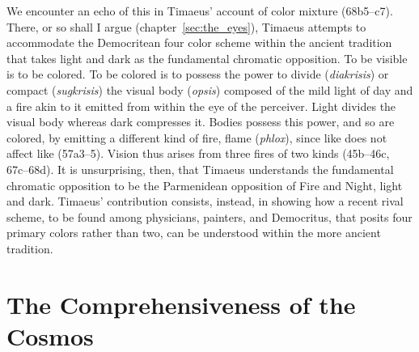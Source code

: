 We encounter an echo of this in Timaeus' account of color mixture (68b5–c7). There, or so shall I argue (chapter~\ref{sec:the_eyes}), Timaeus attempts to accommodate the Democritean four color scheme within the ancient tradition that takes light and dark as the fundamental chromatic opposition. To be visible is to be colored. To be colored is to possess the power to divide (\emph{diakrisis}) or compact (\emph{sugkrisis}) the visual body (\emph{opsis}) composed of the mild light of day and a fire akin to it emitted from within the eye of the perceiver. Light divides the visual body whereas dark compresses it. Bodies possess this power, and so are colored, by emitting a different kind of fire, flame (\emph{phlox}), since like does not affect like (57a3–5). Vision thus arises from three fires of two kinds (45b–46c, 67c–68d). It is unsurprising, then, that Timaeus understands the fundamental chromatic opposition to be the Parmenidean opposition of Fire and Night, light and dark. Timaeus' contribution consists, instead, in showing how a recent rival scheme, to be found among physicians, painters, and Democritus, that posits four primary colors rather than two, can be understood within the more ancient tradition.


\section{The Comprehensiveness of the Cosmos} %
\label{sec:the_comprehensiveness_of_the_Cosmos}

